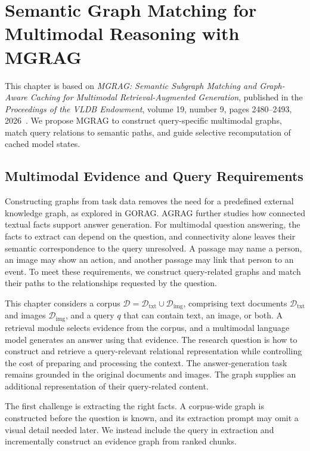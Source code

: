 \chapter{Semantic Graph Matching for Multimodal Reasoning with MGRAG}
\label{ch:mgrag}

This chapter is based on \emph{MGRAG: Semantic Subgraph Matching and Graph-Aware Caching for Multimodal Retrieval-Augmented Generation}, published in the \emph{Proceedings of the VLDB Endowment}, volume 19, number 9, pages 2480--2493, 2026~\cite{mgrag-paper}. We propose MGRAG to construct query-specific multimodal graphs, match query relations to semantic paths, and guide selective recomputation of cached model states.

\section{Multimodal Evidence and Query Requirements}
\label{sec:mgrag:problem}

Constructing graphs from task data removes the need for a predefined external knowledge graph, as explored in GORAG. AGRAG further studies how connected textual facts support answer generation. For multimodal question answering, the facts to extract can depend on the question, and connectivity alone leaves their semantic correspondence to the query unresolved. A passage may name a person, an image may show an action, and another passage may link that person to an event. To meet these requirements, we construct query-related graphs and match their paths to the relationships requested by the question.

This chapter considers a corpus $\mathcal D=\mathcal D_{\mathrm{txt}}\cup\mathcal D_{\mathrm{img}}$, comprising text documents $\mathcal D_{\mathrm{txt}}$ and images $\mathcal D_{\mathrm{img}}$, and a query $q$ that can contain text, an image, or both. A retrieval module selects evidence from the corpus, and a multimodal language model generates an answer using that evidence. The research question is how to construct and retrieve a query-relevant relational representation while controlling the cost of preparing and processing the context. The answer-generation task remains grounded in the original documents and images. The graph supplies an additional representation of their query-related content.

The first challenge is extracting the right facts. A corpus-wide graph is constructed before the question is known, and its extraction prompt may omit a visual detail needed later. We instead include the query in extraction and incrementally construct an evidence graph from ranked chunks.

